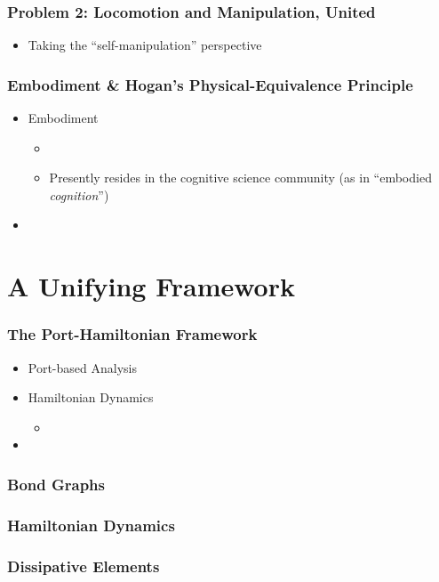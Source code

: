 \documentclass[aspectratio=169]{beamer}
\begin{document}
		\begin{frame}
			\frametitle{Problem 2: Locomotion and Manipulation, United}
			\begin{itemize}
				\item Taking the ``self-manipulation'' perspective
			\end{itemize}
		\end{frame}
	
		\begin{frame}
			\frametitle{Embodiment \& Hogan's Physical-Equivalence Principle}
			\begin{itemize}[<+->]
				\item Embodiment
					\begin{itemize}
						\item 
						\item Presently resides in the cognitive science community (as in ``embodied \emph{cognition}'')
					\end{itemize}
				\item 
			\end{itemize}
		\end{frame}
	
	\section{A Unifying Framework}
		\begin{frame}
			\frametitle{The Port-Hamiltonian Framework}
			\begin{itemize}
				\item Port-based Analysis
				\item Hamiltonian Dynamics
					\begin{itemize}
						\item 
					\end{itemize}
				\item
			\end{itemize}
		\end{frame}
	
		\begin{frame}
			\frametitle{Bond Graphs}
			
		\end{frame}

		\begin{frame}
			\frametitle{Hamiltonian Dynamics}
			
		\end{frame}
	
		\begin{frame}
			\frametitle{Dissipative Elements}
		\end{frame}
\end{document}
